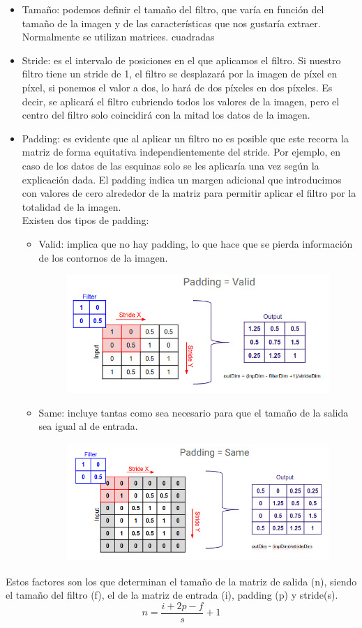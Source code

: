 \documentclass[a4paper,10pt]{article}
\begin{document}
\begin{itemize}
\item Tamaño: podemos definir el tamaño del filtro, que varía en función del tamaño de la imagen y de las características que nos gustaría extraer.  Normalmente se utilizan matrices. cuadradas
\item Stride:  es el intervalo de posiciones en el que aplicamos el filtro. Si nuestro filtro tiene un stride de 1, el filtro se desplazará por la imagen de píxel en píxel,  si ponemos el valor a dos, lo hará de dos píxeles en dos píxeles. Es decir, se aplicará el filtro cubriendo todos los valores de la imagen, pero el centro del filtro solo coincidirá con la mitad los datos de la imagen. 
\item Padding: es evidente que al aplicar un filtro no es posible que este recorra la matriz de forma equitativa independientemente del stride. Por ejemplo, en caso de los datos de las esquinas solo se les aplicaría una vez según la explicación dada. El padding indica un margen adicional que introducimos con valores de cero alrededor de la matriz para permitir aplicar el filtro por la totalidad de la imagen. \\Existen dos tipos de padding:
	\begin{itemize}
	\item Valid: implica que no hay padding, lo que hace que se pierda información de los contornos de la imagen.\begin{figure}[H]
\centering
\includegraphics[width=10.0cm, height=4.5cm]{Annotation 2020-04-13 214927.png}
\end{figure}
	\item Same: incluye tantas como sea necesario para que el tamaño de la salida sea igual al de entrada.\begin{figure}[H]
\centering
\includegraphics[width=11.0cm, height=4.5cm]{Annotation 2020-04-13 215118.png}
\end{figure}
	\end{itemize}
\end{itemize}
Estos factores son los que determinan el tamaño de la matriz de salida (n), siendo el tamaño del filtro (f), el de la matriz de entrada (i), padding (p) y stride(s).
\[
n=\frac{i+2p-f}{s}  +1
\]
\end{document}
